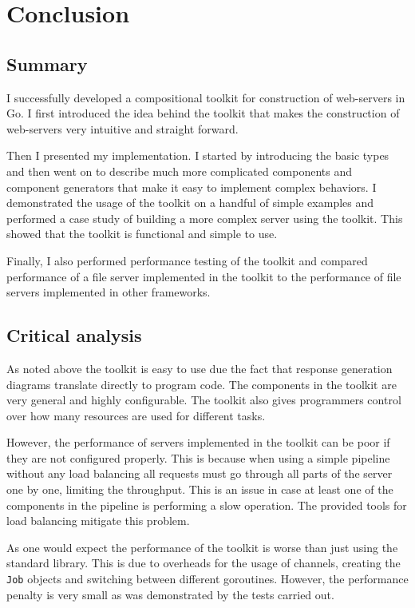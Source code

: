 \section{Conclusion}
\label{sec:conclusion}
\subsection{Summary}
I successfully developed a compositional toolkit for construction of 
web-servers in Go. I first introduced the idea behind the toolkit that 
makes the construction of web-servers very intuitive and straight forward. 

Then I presented my implementation. I started by introducing the basic types
and then went on to describe much more complicated components and component generators
that make it easy to implement complex behaviors. I demonstrated the usage of the 
toolkit on a handful of simple examples and performed a case study of building
a more complex server using the toolkit. This showed that the toolkit is
functional and simple to use. 

Finally, I also performed performance testing of the toolkit and compared
performance of a file server implemented in the toolkit to the performance
of file servers implemented in other frameworks.

\subsection{Critical analysis}
As noted above the toolkit is easy to use due the fact that response 
generation diagrams translate directly to program code. The components
in the toolkit are very general and highly configurable. The toolkit
also gives programmers control over how many resources are used for 
different tasks. 

However, the performance of servers implemented in the toolkit can be 
poor if they are not configured properly. This is because when using a simple
pipeline without any load balancing all requests must go through all parts
of the server one by one, limiting the throughput. This is an issue 
in case at least one of the components in the pipeline is performing a slow operation.
The provided tools for load balancing mitigate this problem.

As one would expect the performance of the toolkit
is worse than just using the standard library. This is due to overheads
for the usage of channels, creating the \texttt{Job} objects
and switching between different goroutines. However, the performance
penalty is very small as was demonstrated by the tests carried out.

